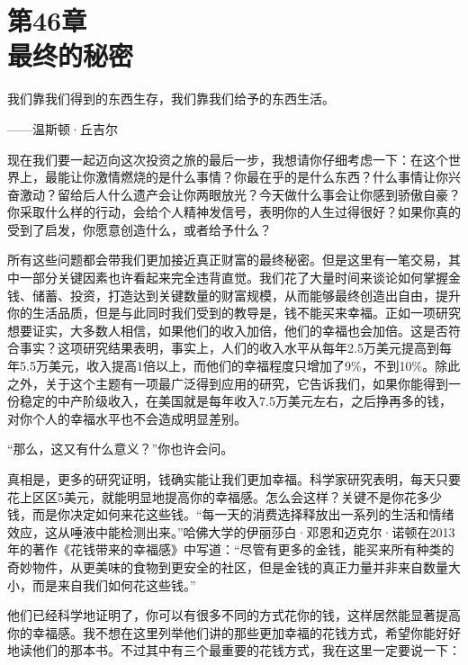 
\section[第46章\q 最终的秘密]{第46章\\ 最终的秘密}

\begin{BookQuote}
我们靠我们得到的东西生存，我们靠我们给予的东西生活。

\hfill ——温斯顿·丘吉尔
\end{BookQuote}

现在我们要一起迈向这次投资之旅的最后一步，我想请你仔细考虑一下：在这个世界上，最能让你激情燃烧的是什么事情？你最在乎的是什么东西？什么事情让你兴奋激动？留给后人什么遗产会让你两眼放光？今天做什么事会让你感到骄傲自豪？你采取什么样的行动，会给个人精神发信号，表明你的人生过得很好？如果你真的受到了启发，你愿意创造什么，或者给予什么？

所有这些问题都会带我们更加接近真正财富的最终秘密。但是这里有一笔交易，其中一部分关键因素也许看起来完全违背直觉。我们花了大量时间来谈论如何掌握金钱、储蓄、投资，打造达到关键数量的财富规模，从而能够最终创造出自由，提升你的生活品质，但是与此同时我们受到的教导是，钱不能买来幸福。正如一项研究想要证实，大多数人相信，如果他们的收入加倍，他们的幸福也会加倍。这是否符合事实？这项研究结果表明，事实上，人们的收入水平从每年2.5万美元提高到每年5.5万美元，收入提高1倍以上，而他们的幸福程度只增加了9\%，不到10\%。除此之外，关于这个主题有一项最广泛得到应用的研究，它告诉我们，如果你能得到一份稳定的中产阶级收入，在美国就是每年收入7.5万美元左右，之后挣再多的钱，对你个人的幸福水平也不会造成明显差别。

“那么，这又有什么意义？”你也许会问。

真相是，更多的研究证明，钱确实能让我们更加幸福。科学家研究表明，每天只要花上区区5美元，就能明显地提高你的幸福感。怎么会这样？关键不是你花多少钱，而是你决定如何来花这些钱。“每一天的消费选择释放出一系列的生活和情绪效应，这从唾液中能检测出来。”哈佛大学的伊丽莎白·邓恩和迈克尔·诺顿在2013年的著作《花钱带来的幸福感》中写道：“尽管有更多的金钱，能买来所有种类的奇妙物件，从更美味的食物到更安全的社区，但是金钱的真正力量并非来自数量大小，而是来自我们如何花这些钱。”

他们已经科学地证明了，你可以有很多不同的方式花你的钱，这样居然能显著提高你的幸福感。我不想在这里列举他们讲的那些更加幸福的花钱方式，希望你能好好地读他们的那本书。不过其中有三个最重要的花钱方式，我在这里一定要说一下：

